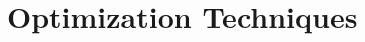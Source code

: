 \documentclass[../main.tex]{subfiles}
\begin{document}
	\chapter{Optimization Techniques}
	
	
	\cite{boyd2004convex} \cite{bertsimas1997introduction}
	
	
\end{document}
